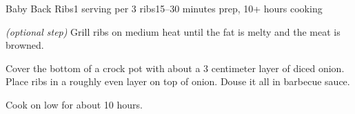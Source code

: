 \documentclass[../Cookbook.tex]{subfiles}
\begin{document}
\begin{recipe}{Baby Back Ribs}{1 serving per 3 ribs}{15--30 minutes prep, 10+ hours cooking}

\textit{(optional step)} Grill ribs on medium heat until the fat is melty and the meat is browned.

Cover the bottom of a crock pot with about a 3 centimeter layer of diced onion. Place ribs in a roughly even layer on top of onion. Douse it all in barbecue sauce.

\newstep
Cook on low for about 10 hours.

\end{recipe}
\end{document}
